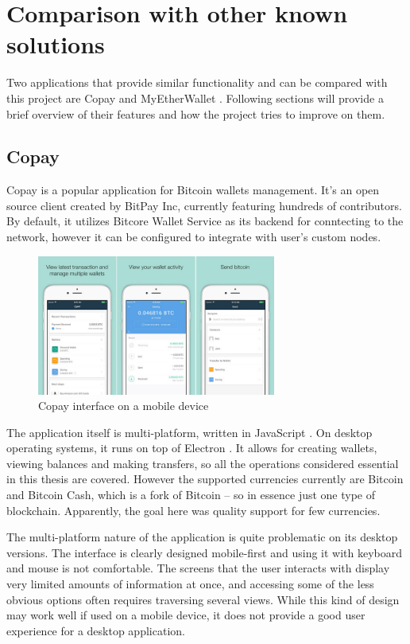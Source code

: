 \chapter{Comparison with other known solutions} \label{3}

Two applications that provide similar functionality
and can be compared with this project are Copay \cite{copay} and MyEtherWallet \cite{mew}.
Following sections will provide a brief overview of their features
and how the project tries to improve on them.

\section{Copay}

Copay is a popular application for Bitcoin wallets management.
It's an open source client created by BitPay Inc,
currently featuring hundreds of contributors.
By default, it utilizes Bitcore Wallet Service as its backend
for conntecting to the network, however it can be configured
to integrate with user's custom nodes.

\begin{figure}[ht]
    \centering
    \includegraphics[width=0.7\textwidth]{assets/copay.jpg}
    \caption{Copay interface on a mobile device}
    \label{3:fig:copay}
\end{figure}

\newpage

The application itself is multi-platform, written in JavaScript \cite{javascript}.
On desktop operating systems, it runs on top of Electron \cite{electron}.
It allows for creating wallets, viewing balances and making transfers,
so all the operations considered essential in this thesis are covered.
However the supported currencies currently are Bitcoin and Bitcoin Cash,
which is a fork of Bitcoin -- so in essence just one type of blockchain.
Apparently, the goal here was quality support for few currencies.

The multi-platform nature of the application is quite problematic
on its desktop versions.
The interface is clearly designed mobile-first
and using it with keyboard and mouse is not comfortable.
The screens that the user interacts with display
very limited amounts of information at once,
and accessing some of the less obvious options
often requires traversing several views.
While this kind of design may work well if used on a mobile device,
it does not provide a good user experience for a desktop application.

